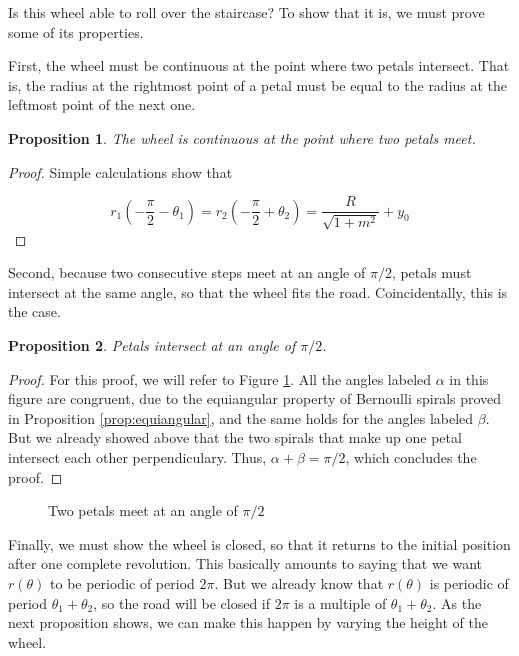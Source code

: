 \documentclass{article}
\theoremstyle{theorem}
\newtheorem{prop}{Proposition}[section]
\theoremstyle{theorem}
\begin{document}
Is this wheel able to roll over the staircase? To show that it is, we
must prove some of its properties.

First, the wheel must be continuous at the point where two petals
intersect. That is, the radius at the rightmost point of a petal must
be equal to the radius at the leftmost point of the next one.

\begin{prop}
  The wheel is continuous at the point where two petals meet.
\end{prop}

\begin{proof}
  Simple calculations show that

  \begin{equation}
    r_1\left(-\frac{\pi}{2}-\theta_1\right)=r_2\left(-\frac{\pi}{2}+\theta_2\right)=\frac{R}{\sqrt{1+m^2}}+y_0
  \end{equation}
\end{proof}

Second, because two consecutive steps meet at an angle of $\pi/2$,
petals must intersect at the same angle, so that the wheel fits the
road. Coincidentally, this is the case.

\begin{prop}
  Petals intersect at an angle of $\pi/2$.
\end{prop}

\begin{proof}
For this proof, we will refer to Figure \ref{fig:complete-wheel}. All
the angles labeled $\alpha$ in this figure are congruent, due to the equiangular property of Bernoulli spirals proved
  in Proposition \ref{prop:equiangular}, and the same holds for the
  angles labeled $\beta$. But we already showed above that the two
  spirals that make up one petal intersect each other perpendiculary. Thus,
  $\alpha+\beta=\pi/2$, which concludes the proof.
\end{proof}

\begin{figure}[h]
\centering

\caption{Two petals meet at an angle of $\pi/2$}
\label{fig:complete-wheel}
\end{figure}


Finally, we must show the wheel is closed, so that it returns to the
initial position after one complete revolution. This basically amounts
to saying that we want $r(\theta)$ to be periodic of period
$2\pi$. But we already know that $r(\theta)$ is periodic of period
$\theta_1+\theta_2$, so the road will be closed if $2\pi$ is a
multiple of $\theta_1+\theta_2$. As the next proposition shows, we can
make this happen by varying the height of the wheel.
\end{document}
